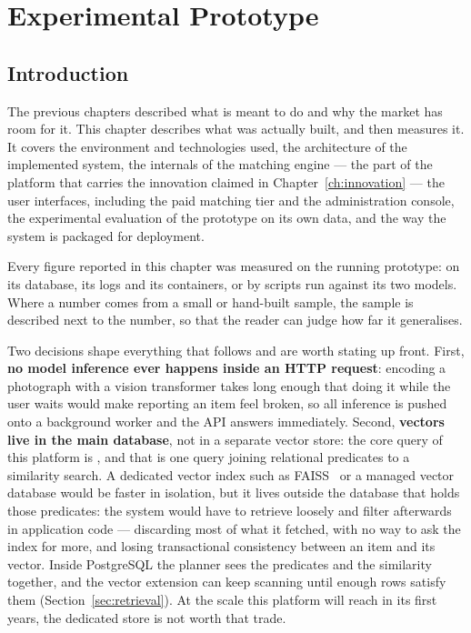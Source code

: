 \chapter{Experimental Prototype}
\label{ch:prototype}

\section{Introduction}

The previous chapters described what \projectname{} is meant to do and why the
market has room for it. This chapter describes what was actually built, and then
measures it. It covers the environment and technologies used, the architecture
of the implemented system, the internals of the matching engine --- the part of
the platform that carries the innovation claimed in
Chapter~\ref{ch:innovation} --- the user interfaces, including the paid matching
tier and the administration console, the experimental evaluation of the
prototype on its own data, and the way the system is packaged for deployment.

Every figure reported in this chapter was measured on the running prototype:
on its database, its logs and its containers, or by scripts run against its two
models. Where a number comes from a small or hand-built sample, the sample is
described next to the number, so that the reader can judge how far it
generalises.

Two decisions shape everything that follows and are worth stating up front.
First, \textbf{no model inference ever happens inside an HTTP request}: encoding
a photograph with a vision transformer takes long enough that doing it while the
user waits would make reporting an item feel broken, so all inference is pushed
onto a background worker and the API answers immediately. Second,
\textbf{vectors live in the main database}, not in a separate vector store: the
core query of this platform is , and that is one query joining relational predicates to a
similarity search. A dedicated vector index such as FAISS~\cite{johnson2021faiss}
or a managed vector database would be faster in isolation, but it lives outside
the database that holds those predicates: the system would have to retrieve
loosely and filter afterwards in application code --- discarding most of what
it fetched, with no way to ask the index for more, and losing transactional
consistency between an item and its vector. Inside PostgreSQL the planner sees
the predicates and the similarity together, and the vector extension can keep
scanning until enough rows satisfy them (Section~\ref{sec:retrieval}). At the
scale this platform will reach in its first years, the dedicated store is not
worth that trade.

